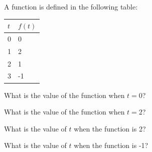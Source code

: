 \begin{problem}
\item A function is defined in the following table:

  \begin{tabular}{l|l}
    $t$ & $f(t)$ \\ \hline 
    0 & 0 \\
    1 & 2 \\
    2 & 1 \\
    3 & -1 
  \end{tabular}

  \begin{subproblem}
  \item What is the value of the function when $t=0$?
    \vfill
  \item What is the value of the function when $t=2$?
    \vfill
  \item What is the value of $t$ when the function is 2?
    \vfill
  \item What is the value of $t$ when the function is -1?
    \vfill
  \end{subproblem}

\end{problem}


